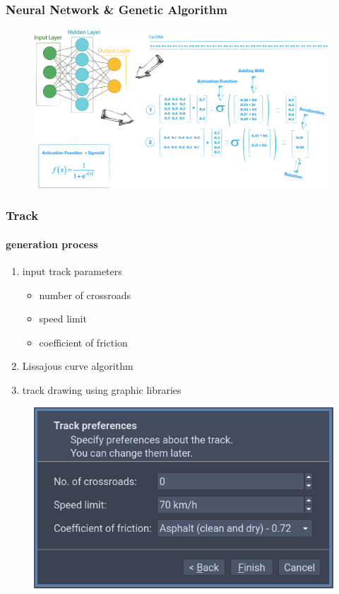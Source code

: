 \documentclass{beamer}
\begin{document}
\begin{frame}
	\frametitle{Neural Network \& Genetic Algorithm}

	\begin{figure}
		\centering
		\includegraphics[width=11cm]{images/NN.png}
	\end{figure}

\end{frame}

\begin{frame}
	\frametitle{Track}
	\framesubtitle{generation process}

	\begin{exampleblock}{}
		\begin{enumerate}
			\item input track parameters
			      \begin{itemize}
				      \item number of crossroads
				      \item speed limit
				      \item coefficient of friction
			      \end{itemize}
			\item Lissajous curve algorithm
			\item track drawing using graphic libraries
		\end{enumerate}
	\end{exampleblock}

	\begin{figure}
		\centering
		\includegraphics[scale=0.25]{images/yasd-track.png}
	\end{figure}
\end{frame}
\end{document}
